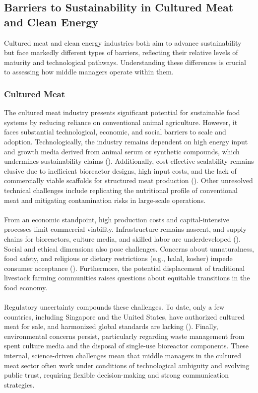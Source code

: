 	\subsection{Barriers to Sustainability in Cultured Meat and Clean Energy}
	Cultured meat and clean energy industries both aim to advance sustainability but face markedly different types of barriers, reflecting their relative levels of maturity and technological pathways. Understanding these differences is crucial to assessing how middle managers operate within them.
	
	\subsubsection{Cultured Meat}
	The cultured meat industry presents significant potential for sustainable food systems by reducing reliance on conventional animal agriculture. However, it faces substantial technological, economic, and social barriers to scale and adoption. Technologically, the industry remains dependent on high energy input and growth media derived from animal serum or synthetic compounds, which undermines sustainability claims (\textcite{Specht2023, Post2020}). Additionally, cost-effective scalability remains elusive due to inefficient bioreactor designs, high input costs, and the lack of commercially viable scaffolds for structured meat production (\textcite{Bodiou2020}). Other unresolved technical challenges include replicating the nutritional profile of conventional meat and mitigating contamination risks in large-scale operations.
	
	\paragraph*{} From an economic standpoint, high production costs and capital-intensive processes limit commercial viability. Infrastructure remains nascent, and supply chains for bioreactors, culture media, and skilled labor are underdeveloped (\textcite{Stephens2018}). Social and ethical dimensions also pose challenges. Concerns about unnaturalness, food safety, and religious or dietary restrictions (e.g., halal, kosher) impede consumer acceptance (\textcite{Bryant2020}). Furthermore, the potential displacement of traditional livestock farming communities raises questions about equitable transitions in the food economy.
	
	\paragraph*{} Regulatory uncertainty compounds these challenges. To date, only a few countries, including Singapore and the United States, have authorized cultured meat for sale, and harmonized global standards are lacking (\textcite{SFA2020, FDA2023}). Finally, environmental concerns persist, particularly regarding waste management from spent culture media and the disposal of single-use bioreactor components. These internal, science-driven challenges mean that middle managers in the cultured meat sector often work under conditions of technological ambiguity and evolving public trust, requiring flexible decision-making and strong communication strategies.
	
